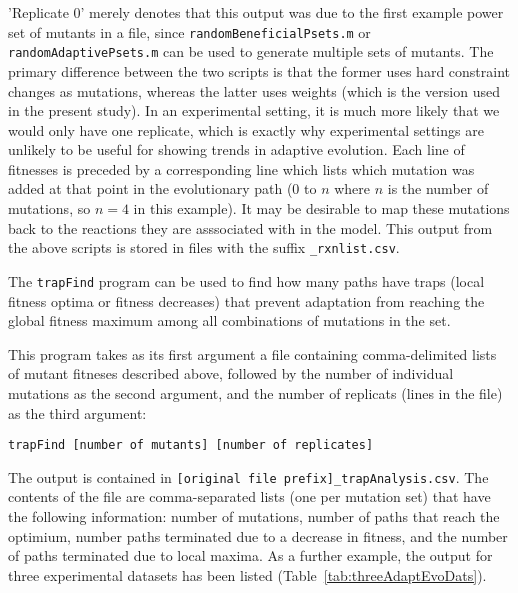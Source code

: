 
'Replicate 0' merely denotes that this output was due to the first
example power set of mutants in a file, since
\texttt{randomBeneficialPsets.m} or \texttt{randomAdaptivePsets.m} can
be used to generate multiple sets of mutants. The primary difference
between the two scripts is that the former uses hard constraint
changes as mutations, whereas the latter uses weights (which is the
version used in the present study).  In an experimental setting,
it is much more likely that we would only have one replicate, which is
exactly why experimental settings are unlikely to be useful for
showing trends in adaptive evolution. Each line of fitnesses is
preceded by a corresponding line which lists which mutation was added
at that point in the evolutionary path (0 to $n$ where $n$ is the
number of mutations, so $n = 4$ in this example). It may be desirable 
to map these mutations back to the reactions they are asssociated with
in the model. This output from the above scripts is stored in files
with the suffix \texttt{\_rxnlist.csv}.

The \texttt{trapFind} program can be used to find how many paths have
traps (local fitness optima or fitness decreases) that prevent
adaptation from reaching the global fitness maximum among all
combinations of mutations in the set.

This program takes as its first argument a file containing comma-delimited 
lists of mutant fitneses described above, followed by the number of 
individual mutations as the second argument, and the number of replicats 
(lines in the file) as the third argument:

\vspace{1ex}
\noindent
\texttt{trapFind [number of mutants] [number of replicates]}
\label{trapFindCmd}
\vspace{1ex}
 
The output is contained in \texttt{[original file
prefix]\_trapAnalysis.csv}. The contents of the file are
comma-separated lists (one per mutation set) that have the following
information: number of mutations, number of paths that reach the
optimium, number paths terminated due to a decrease in fitness, and
the number of paths terminated due to local maxima. As a further
example, the output for three experimental datasets has been listed
(Table~\ref{tab:threeAdaptEvoDats}).

